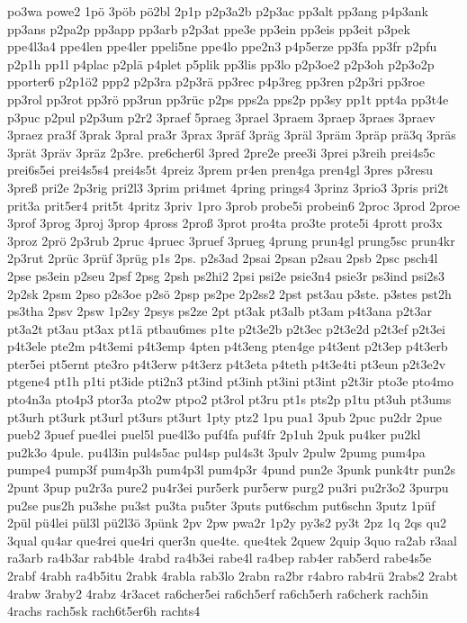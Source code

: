 {po3wa
powe2
1pö
3pöb
pö2bl
2p1p
p2p3a2b
p2p3ac
pp3alt
pp3ang
p4p3ank
pp3ans
p2pa2p
pp3app
pp3arb
p2p3at
ppe3e
pp3ein
pp3eis
pp3eit
p3pek
ppe4l3a4
ppe4len
ppe4ler
ppeli5ne
ppe4lo
ppe2n3
p4p5erze
pp3fa
pp3fr
p2pfu
p2p1h
pp1l
p4plac
p2plä
p4plet
p5plik
pp3lis
pp3lo
p2p3oe2
p2p3oh
p2p3o2p
pporter6
p2p1ö2
ppp2
p2p3ra
p2p3rä
pp3rec
p4p3reg
pp3ren
p2p3ri
pp3roe
pp3rol
pp3rot
pp3rö
pp3run
pp3rüc
p2ps
pps2a
pps2p
pp3sy
pp1t
ppt4a
pp3t4e
p3puc
p2pul
p2p3um
p2r2
3praef
5praeg
3prael
3praem
3praep
3praes
3praev
3praez
pra3f
3prak
3pral
pra3r
3prax
3präf
3präg
3präl
3präm
3präp
prä3q
3präs
3prät
3präv
3präz
2p3re.
pre6cher6l
3pred
2pre2e
pree3i
3prei
p3reih
prei4s5c
prei6s5ei
prei4s5s4
prei4s5t
4preiz
3prem
pr4en
pren4ga
pren4gl
3pres
p3resu
3preß
pri2e
2p3rig
pri2l3
3prim
pri4met
4pring
prings4
3prinz
3prio3
3pris
pri2t
prit3a
prit5er4
prit5t
4pritz
3priv
1pro
3prob
probe5i
probein6
2proc
3prod
2proe
3prof
3prog
3proj
3prop
4pross
2proß
3prot
pro4ta
pro3te
prote5i
4prott
pro3x
3proz
2prö
2p3rub
2pruc
4pruec
3pruef
3prueg
4prung
prun4gl
prung5sc
prun4kr
2p3rut
2prüc
3prüf
3prüg
p1s
2ps.
p2s3ad
2psai
2psan
p2sau
2psb
2psc
psch4l
2pse
ps3ein
p2seu
2psf
2psg
2psh
ps2hi2
2psi
psi2e
psie3n4
psie3r
ps3ind
psi2s3
2p2sk
2psm
2pso
p2s3oe
p2sö
2psp
ps2pe
2p2ss2
2pst
pst3au
p3ste.
p3stes
pst2h
ps3tha
2psv
2psw
1p2sy
2psys
ps2ze
2pt
pt3ak
pt3alb
pt3am
p4t3ana
p2t3ar
pt3a2t
pt3au
pt3ax
pt1ä
ptbau6mes
p1te
p2t3e2b
p2t3ec
p2t3e2d
p2t3ef
p2t3ei
p4t3ele
pte2m
p4t3emi
p4t3emp
4pten
p4t3eng
pten4ge
p4t3ent
p2t3ep
p4t3erb
pter5ei
pt5ernt
pte3ro
p4t3erw
p4t3erz
p4t3eta
p4teth
p4t3e4ti
pt3eun
p2t3e2v
ptgene4
pt1h
p1ti
pt3ide
pti2n3
pt3ind
pt3inh
pt3ini
pt3int
p2t3ir
pto3e
pto4mo
pto4n3a
pto4p3
ptor3a
pto2w
ptpo2
pt3rol
pt3ru
pt1s
pts2p
p1tu
pt3uh
pt3ums
pt3urh
pt3urk
pt3url
pt3urs
pt3urt
1pty
ptz2
1pu
pua1
3pub
2puc
pu2dr
2pue
pueb2
3puef
pue4lei
puel5l
pue4l3o
puf4fa
puf4fr
2p1uh
2puk
pu4ker
pu2kl
pu2k3o
4pule.
pu4l3in
pul4s5ac
pul4sp
pul4s3t
3pulv
2pulw
2pumg
pum4pa
pumpe4
pump3f
pum4p3h
pum4p3l
pum4p3r
4pund
pun2e
3punk
punk4tr
pun2s
2punt
3pup
pu2r3a
pure2
pu4r3ei
pur5erk
pur5erw
purg2
pu3ri
pu2r3o2
3purpu
pu2se
pus2h
pu3she
pu3st
pu3ta
pu5ter
3puts
put6schm
put6schn
3putz
1püf
2pül
pü4lei
pül3l
pü2l3ö
3pünk
2pv
2pw
pwa2r
1p2y
py3s2
py3t
2pz
1q
2qs
qu2
3qual
qu4ar
que4rei
que4ri
quer3n
que4te.
que4tek
2quew
2quip
3quo
ra2ab
r3aal
ra3arb
ra4b3ar
rab4ble
4rabd
ra4b3ei
rabe4l
ra4bep
rab4er
rab5erd
rabe4s5e
2rabf
4rabh
ra4b5itu
2rabk
4rabla
rab3lo
2rabn
ra2br
r4abro
rab4rü
2rabs2
2rabt
4rabw
3raby2
4rabz
4r3acet
ra6cher5ei
ra6ch5erf
ra6ch5erh
ra6cherk
rach5in
4rachs
rach5sk
rach6t5er6h
rachts4
}
